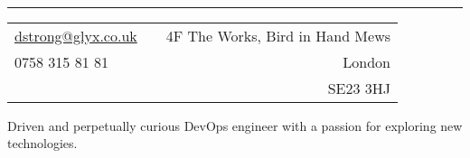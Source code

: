 \documentclass[a4paper,10pt]{article} %
\begin{document}
\pagestyle{empty} %


\\ %
\hrule
\footnotesize
{\begin{tabularx}{\textwidth}{lXr}
\href{mailto:dstrong@glyx.co.uk}{dstrong@glyx.co.uk} & & {4F The Works, Bird in Hand Mews}\\
{0758 315 81 81}                                     & & {London}\\
                                                     & & {SE23 3HJ}
\end{tabularx}}

\begin{flushleft}
Driven and perpetually curious DevOps engineer with a passion for exploring new technologies.
\end{flushleft}

\end{document}
